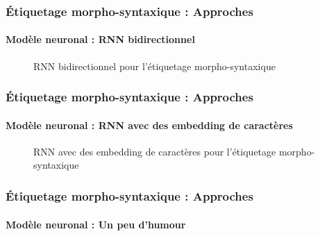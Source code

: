 \documentclass[xcolor=table]{beamer}
\begin{document}
\begin{frame}
\frametitle{Étiquetage morpho-syntaxique : Approches}
\framesubtitle{Modèle neuronal : RNN bidirectionnel}

\begin{figure}
	\centering
	\caption{RNN bidirectionnel pour l'étiquetage morpho-syntaxique \cite{2019-jurafsky-martin}}
\end{figure}

\end{frame}

\begin{frame}
\frametitle{Étiquetage morpho-syntaxique : Approches}
\framesubtitle{Modèle neuronal : RNN avec des embedding de caractères}

\begin{figure}
	\centering
	\caption{RNN avec des embedding de caractères pour l'étiquetage morpho-syntaxique \cite{2019-jurafsky-martin}}
\end{figure}

\end{frame}

\begin{frame}
\frametitle{Étiquetage morpho-syntaxique : Approches}
\framesubtitle{Modèle neuronal : Un peu d'humour}

\begin{center}
\end{center}

\end{frame}

\end{document}
